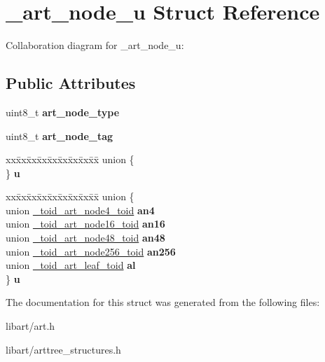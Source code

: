 \hypertarget{struct__art__node__u}{}\section{\+\_\+art\+\_\+node\+\_\+u Struct Reference}
\label{struct__art__node__u}


Collaboration diagram for \+\_\+art\+\_\+node\+\_\+u\+:
\subsection*{Public Attributes}
\begin{DoxyCompactItemize}
\item 
\mbox{\label{struct__art__node__u_a7a307683078edd5e38b8aa14a783393f}} 
uint8\+\_\+t {\bfseries art\+\_\+node\+\_\+type}
\item 
\mbox{\label{struct__art__node__u_ae36910ced1e3012676429e15b6e41991}} 
uint8\+\_\+t {\bfseries art\+\_\+node\+\_\+tag}
\item 
\mbox{\label{struct__art__node__u_a457159e1eb7a00a0b939936f087b9f26}} 
\begin{tabbing}
xx\=xx\=xx\=xx\=xx\=xx\=xx\=xx\=xx\=\kill
union \{\\
\} {\bfseries u}\\

\end{tabbing}\item 
\mbox{\label{struct__art__node__u_a9511a898c16de6c671d511d8f2c33d9d}} 
\begin{tabbing}
xx\=xx\=xx\=xx\=xx\=xx\=xx\=xx\=xx\=\kill
union \{\\
\>union \hyperlink{union__toid__art__node4__toid}{\_toid\_art\_node4\_toid} {\bfseries an4}\\
\>union \hyperlink{union__toid__art__node16__toid}{\_toid\_art\_node16\_toid} {\bfseries an16}\\
\>union \hyperlink{union__toid__art__node48__toid}{\_toid\_art\_node48\_toid} {\bfseries an48}\\
\>union \hyperlink{union__toid__art__node256__toid}{\_toid\_art\_node256\_toid} {\bfseries an256}\\
\>union \hyperlink{union__toid__art__leaf__toid}{\_toid\_art\_leaf\_toid} {\bfseries al}\\
\} {\bfseries u}\\

\end{tabbing}\end{DoxyCompactItemize}


The documentation for this struct was generated from the following files\+:\begin{DoxyCompactItemize}
\item 
libart/art.\+h\item 
libart/arttree\+\_\+structures.\+h\end{DoxyCompactItemize}
